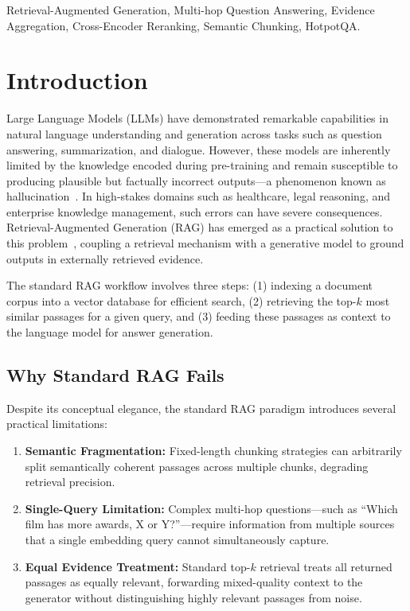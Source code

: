\documentclass[conference]{IEEEtran}
\begin{document}
\begin{IEEEkeywords}
Retrieval-Augmented Generation, Multi-hop Question Answering, Evidence Aggregation, Cross-Encoder Reranking, Semantic Chunking, HotpotQA.
\end{IEEEkeywords}

\section{Introduction}

Large Language Models (LLMs) have demonstrated remarkable capabilities in natural language understanding and generation across tasks such as question answering, summarization, and dialogue. However, these models are inherently limited by the knowledge encoded during pre-training and remain susceptible to producing plausible but factually incorrect outputs---a phenomenon known as hallucination~\cite{ji2023survey}. In high-stakes domains such as healthcare, legal reasoning, and enterprise knowledge management, such errors can have severe consequences. Retrieval-Augmented Generation (RAG) has emerged as a practical solution to this problem~\cite{lewis2020rag}, coupling a retrieval mechanism with a generative model to ground outputs in externally retrieved evidence.

The standard RAG workflow involves three steps: (1) indexing a document corpus into a vector database for efficient search, (2) retrieving the top-$k$ most similar passages for a given query, and (3) feeding these passages as context to the language model for answer generation.

\subsection{Why Standard RAG Fails}

Despite its conceptual elegance, the standard RAG paradigm introduces several practical limitations:
\begin{enumerate}[leftmargin=*]
\item \textbf{Semantic Fragmentation:} Fixed-length chunking strategies can arbitrarily split semantically coherent passages across multiple chunks, degrading retrieval precision.
\item \textbf{Single-Query Limitation:} Complex multi-hop questions---such as ``Which film has more awards, X or Y?''---require information from multiple sources that a single embedding query cannot simultaneously capture.
\item \textbf{Equal Evidence Treatment:} Standard top-$k$ retrieval treats all returned passages as equally relevant, forwarding mixed-quality context to the generator without distinguishing highly relevant passages from noise.
\end{enumerate}
\end{document}
